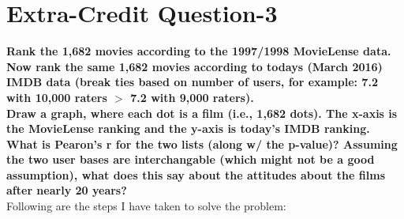 \chapter{Extra-Credit Question-3}
\label{intro}

\textbf{Rank the 1,682 movies according to the 1997/1998 MovieLense data.  Now rank the same 1,682 movies according to todays (March 2016) IMDB data (break ties based on number of users, for example: 7.2 with 10,000 raters $>$ 7.2 with 9,000 raters).\\
Draw a graph, where each dot is a film (i.e., 1,682 dots).  The x-axis is the MovieLense ranking and the y-axis is today's IMDB
ranking. \\
What is Pearon's r for the two lists (along w/ the p-value)?  Assuming the two user bases are interchangable (which might not be a good
assumption), what does this say about the attitudes about the films after nearly 20 years?}\\


Following are the steps I have taken to solve the problem:

